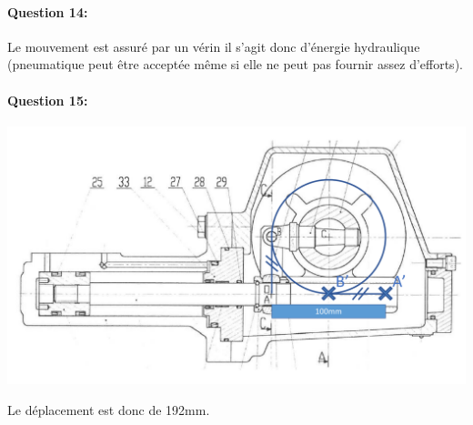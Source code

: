 \paragraph{Question 14:} Le mouvement est assuré par un vérin il s'agit donc d'énergie hydraulique (pneumatique peut être acceptée même si elle ne peut pas fournir assez d'efforts).

\paragraph{Question 15:} 

\begin{center}
 \includegraphics[width=0.8\linewidth]{img/trace_corrige}
\end{center}

Le déplacement est donc de 192mm.




